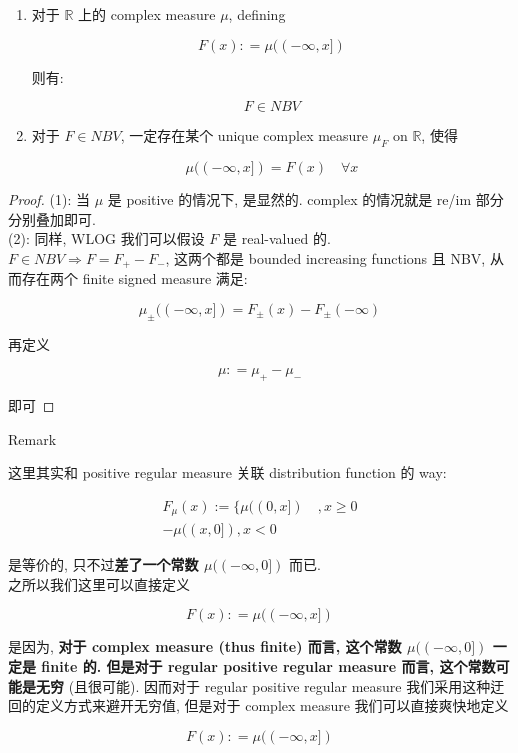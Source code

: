 \begin{theorem}{}

\begin{enumerate}
\item
  对于 \(\mathbb{R}\) 上的 complex measure \(\mu\), defining

  \[F(x): = \mu(( - \infty,x\rbrack)\]

  则有:

  \[F \in NBV\]
\item
  对于 \(F \in NBV\), 一定存在某个 unique complex measure \(\mu_{F}\) on \(\mathbb{R}\), 使得

  \[\mu(( - \infty,x\rbrack) = F(x)\quad\forall x\]
\end{enumerate}

\end{theorem}

\begin{proof}

(1): 当 \(\mu\) 是 positive 的情况下, 是显然的. complex 的情况就是 re/im 部分分别叠加即可.\\
(2): 同样, WLOG 我们可以假设 \(F\) 是 real-valued 的.\\
\(F \in NBV\Longrightarrow F = F_{+} - F_{-}\), 这两个都是 bounded increasing functions 且 NBV, 从而存在两个 finite signed measure 满足:

\[\mu_{\pm}(( - \infty,x\rbrack) = F_{\pm}(x) - F_{\pm}( - \infty)\]

再定义

\[\mu: = \mu_{+} - \mu_{-}\]

即可

\end{proof}

\begin{qlremark}{Remark}

这里其实和 positive regular measure 关联 distribution function 的 way:

\[\begin{matrix}
{F_{\mu}(x) := \{\mu((0,x\rbrack)\quad,x \geq 0} \\
{- \mu((x,0\rbrack),x < 0}
\end{matrix}\]

是等价的, 只不过\textbf{差了一个常数 \(\mu(( - \infty,0\rbrack)\)} 而已.\\
之所以我们这里可以直接定义

\[F(x): = \mu(( - \infty,x\rbrack)\]

是因为, \textbf{对于 complex measure (thus finite) 而言, 这个常数 \(\mu(( - \infty,0\rbrack)\) 一定是 finite 的. 但是对于 regular positive regular measure 而言, 这个常数可能是无穷} (且很可能). 因而对于 regular positive regular measure 我们采用这种迂回的定义方式来避开无穷值, 但是对于 complex measure 我们可以直接爽快地定义

\[F(x): = \mu(( - \infty,x\rbrack)\]

\end{qlremark}

